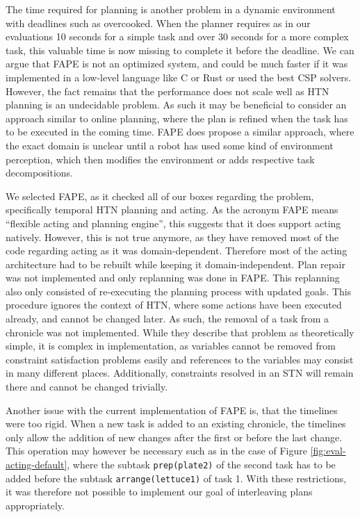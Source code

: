 The time required for planning is another problem in a dynamic environment with deadlines such as overcooked.
When the planner requires as in our evaluations 10 seconds for a simple task and over 30 seconds for a more complex task, this valuable time is now missing to complete it before the deadline.
We can argue that FAPE is not an optimized system, and could be much faster if it was implemented in a low-level language like C or Rust or used the best CSP solvers.
However, the fact remains that the performance does not scale well as HTN planning is an undecidable problem.
As such it may be beneficial to consider an approach similar to online planning, where the plan is refined when the task has to be executed in the coming time.
FAPE does propose a similar approach, where the exact domain is unclear until a robot has used some kind of environment perception, which then modifies the environment or adds respective task decompositions.

We selected FAPE, as it checked all of our boxes regarding the problem, specifically temporal HTN planning and acting.
As the acronym FAPE means ``flexible acting and planning engine'', this suggests that it does support acting natively.
However, this is not true anymore, as they have removed most of the code regarding acting as it was domain-dependent.
Therefore most of the acting architecture had to be rebuilt while keeping it domain-independent.
Plan repair was not implemented and only replanning was done in FAPE. This replanning also only consisted of re-executing the planning process with updated goals.
This procedure ignores the context of HTN, where some actions have been executed already, and cannot be changed later.
As such, the removal of a task from a chronicle was not implemented.
While they describe that problem as theoretically simple, it is complex in implementation, as variables cannot be removed from constraint satisfaction problems easily and references to the variables may consist in many different places.
Additionally, constraints resolved in an STN will remain there and cannot be changed trivially.

Another issue with the current implementation of FAPE is, that the timelines were too rigid.
When a new task is added to an existing chronicle, the timelines only allow the addition of new changes after the first or before the last change.
This operation may however be necessary such as in the case of Figure \ref{fig:eval-acting-default}, where the subtask \verb|prep(plate2)| of the second task has to be added before the subtask \verb|arrange(lettuce1)| of task 1.
With these restrictions, it was therefore not possible to implement our goal of interleaving plans appropriately.

